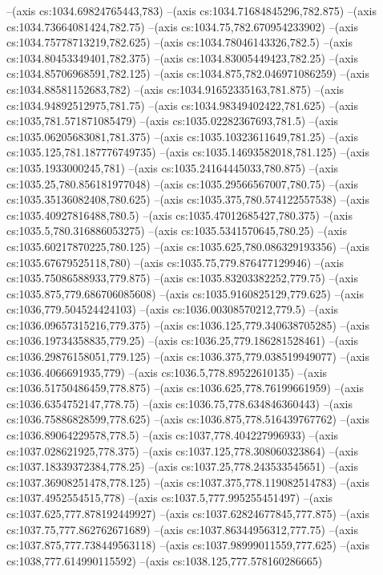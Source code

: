 --(axis cs:1034.69824765443,783)
--(axis cs:1034.71684845296,782.875)
--(axis cs:1034.73664081424,782.75)
--(axis cs:1034.75,782.670954233902)
--(axis cs:1034.75778713219,782.625)
--(axis cs:1034.78046143326,782.5)
--(axis cs:1034.80453349401,782.375)
--(axis cs:1034.83005449423,782.25)
--(axis cs:1034.85706968591,782.125)
--(axis cs:1034.875,782.046971086259)
--(axis cs:1034.88581152683,782)
--(axis cs:1034.91652335163,781.875)
--(axis cs:1034.94892512975,781.75)
--(axis cs:1034.98349402422,781.625)
--(axis cs:1035,781.571871085479)
--(axis cs:1035.02282367693,781.5)
--(axis cs:1035.06205683081,781.375)
--(axis cs:1035.10323611649,781.25)
--(axis cs:1035.125,781.187776749735)
--(axis cs:1035.14693582018,781.125)
--(axis cs:1035.1933000245,781)
--(axis cs:1035.24164445033,780.875)
--(axis cs:1035.25,780.856181977048)
--(axis cs:1035.29566567007,780.75)
--(axis cs:1035.35136082408,780.625)
--(axis cs:1035.375,780.574122557538)
--(axis cs:1035.40927816488,780.5)
--(axis cs:1035.47012685427,780.375)
--(axis cs:1035.5,780.316886053275)
--(axis cs:1035.5341570645,780.25)
--(axis cs:1035.60217870225,780.125)
--(axis cs:1035.625,780.086329193356)
--(axis cs:1035.67679525118,780)
--(axis cs:1035.75,779.876477129946)
--(axis cs:1035.75086588933,779.875)
--(axis cs:1035.83203382252,779.75)
--(axis cs:1035.875,779.686706085608)
--(axis cs:1035.9160825129,779.625)
--(axis cs:1036,779.504524424103)
--(axis cs:1036.00308570212,779.5)
--(axis cs:1036.09657315216,779.375)
--(axis cs:1036.125,779.340638705285)
--(axis cs:1036.19734358835,779.25)
--(axis cs:1036.25,779.186281528461)
--(axis cs:1036.29876158051,779.125)
--(axis cs:1036.375,779.038519949077)
--(axis cs:1036.4066691935,779)
--(axis cs:1036.5,778.89522610135)
--(axis cs:1036.51750486459,778.875)
--(axis cs:1036.625,778.76199661959)
--(axis cs:1036.6354752147,778.75)
--(axis cs:1036.75,778.634846360443)
--(axis cs:1036.75886828599,778.625)
--(axis cs:1036.875,778.516439767762)
--(axis cs:1036.89064229578,778.5)
--(axis cs:1037,778.404227996933)
--(axis cs:1037.028621925,778.375)
--(axis cs:1037.125,778.308060323864)
--(axis cs:1037.18339372384,778.25)
--(axis cs:1037.25,778.243533545651)
--(axis cs:1037.36908251478,778.125)
--(axis cs:1037.375,778.119082514783)
--(axis cs:1037.4952554515,778)
--(axis cs:1037.5,777.995255451497)
--(axis cs:1037.625,777.878192449927)
--(axis cs:1037.62824677845,777.875)
--(axis cs:1037.75,777.862762671689)
--(axis cs:1037.86344956312,777.75)
--(axis cs:1037.875,777.738449563118)
--(axis cs:1037.98999011559,777.625)
--(axis cs:1038,777.614990115592)
--(axis cs:1038.125,777.578160286665)

